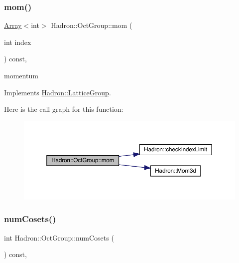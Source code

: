 \subsubsection{\texorpdfstring{mom()}{mom()}\hspace{0.1cm}{\footnotesize\ttfamily [2/2]}}
{\footnotesize\ttfamily \mbox{\hyperlink{classXMLArray_1_1Array}{Array}}$<$int$>$ Hadron\+::\+Oct\+Group\+::mom (\begin{DoxyParamCaption}\item[{int}]{index }\end{DoxyParamCaption}) const\hspace{0.3cm}{\ttfamily [inline]}, {\ttfamily [virtual]}}

momentum 

Implements \mbox{\hyperlink{structHadron_1_1LatticeGroup_ad577b65041dd9a6e84b1f3bd49cb8fce}{Hadron\+::\+Lattice\+Group}}.

Here is the call graph for this function\+:
\nopagebreak
\begin{figure}[H]
\begin{center}
\leavevmode
\includegraphics[width=350pt]{d1/de5/structHadron_1_1OctGroup_ab3c3d81d578cac614b1ccdd456f8ea59_cgraph}
\end{center}
\end{figure}
\mbox{\label{structHadron_1_1OctGroup_a85ea73ed466c052783d454b14d5b30bc}} 
\subsubsection{\texorpdfstring{numCosets()}{numCosets()}\hspace{0.1cm}{\footnotesize\ttfamily [1/2]}}
{\footnotesize\ttfamily int Hadron\+::\+Oct\+Group\+::num\+Cosets (\begin{DoxyParamCaption}{ }\end{DoxyParamCaption}) const\hspace{0.3cm}{\ttfamily [inline]}, {\ttfamily [virtual]}}

